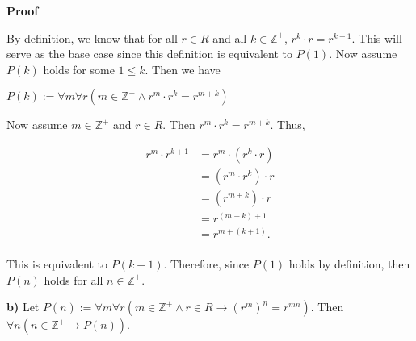\documentclass[12pt, a4paper]{article}
\begin{document}
\begin{addmargin}[2.8em]{2.8em}
    
    \vspace{4mm}
    
    \noindent\textbf{Proof} 
    
    \vspace{2mm}
    
    \noindent By definition, we know that for all $r\in R$ and all $k\in\mathbb{Z}^+$, $r^k\cdot r=r^{k+1}$. This will serve as the base case since this definition is equivalent to $P(1)$. Now assume $P(k)$ holds for some $1\leq k$. Then we have 
    
    \newpage
    
    \centerline{$P(k):=\forall m\forall r(m\in\mathbb{Z}^+\wedge r^m\cdot r^k=r^{m+k})$}
    
    \vspace{4mm}
    
    \noindent Now assume $m\in\mathbb{Z}^+$ and $r\in R$. Then $r^m\cdot r^k=r^{m+k}$. Thus,
    
    \begin{equation*}
        \begin{split}
            r^m\cdot r^{k+1}& =r^m\cdot(r^k\cdot r) \\
            & =(r^m\cdot r^k)\cdot r \\
            & =(r^{m+k})\cdot r \\
            & =r^{(m+k)+1} \\
            & =r^{m+(k+1)}. \\
        \end{split}
    \end{equation*}
    
    \noindent This is equivalent to $P(k+1)$. Therefore, since $P(1)$ holds by definition, then $P(n)$ holds for all $n\in\mathbb{Z}^+$.\hspace{76mm}\blacksquare
    
    \vspace{6mm}

\end{addmargin}

\par\textbf{b)} Let $P(n):=\forall m\forall r(m\in\mathbb{Z}^+\wedge r\in R\rightarrow(r^m)^n=r^{mn})$. Then $\forall n(n\in\mathbb{Z}^+\rightarrow P(n))$.

\vspace{4mm}
\end{document}
